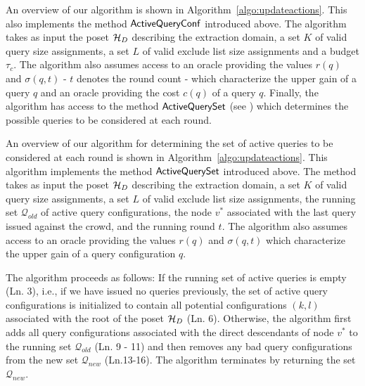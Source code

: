 An overview of our algorithm is shown in Algorithm~\ref{algo:updateactions}. This also implements the method ${\sf ActiveQueryConf}$ introduced above. The algorithm takes as input the poset $\mathcal{H}_D$ describing the extraction domain, a set $K$ of valid query size assignments, a set $L$ of valid exclude list size assignments and a budget $\tau_c$. The algorithm also assumes access to an oracle providing the values $r(q)$ and $\sigma(q,t)$ - $t$ denotes the round count -  which characterize the upper gain of a query $q$ and an oracle providing the cost $c(q)$ of a query $q$. Finally, the algorithm has access to the method ${\sf ActiveQuerySet}$ (see ) which determines the possible queries to be considered at each round.

An overview of our algorithm for determining the set of active queries to be considered at each round is shown in Algorithm~\ref{algo:updateactions}. This algorithm implements the method ${\sf ActiveQuerySet}$ introduced above. The method takes as input the poset $\mathcal{H}_D$ describing the extraction domain, a set $K$ of valid query size assignments, a set $L$ of valid exclude list size assignments, the running set $\mathcal{Q}_{old}$ of active query configurations, the node $v^*$ associated with the last query issued against the crowd, and the running round $t$. The algorithm also assumes access to an oracle providing the values $r(q)$ and $\sigma(q,t)$  which characterize the upper gain of a query configuration $q$.

The algorithm proceeds as follows: If the running set of active queries is empty (Ln. 3), i.e., if we have issued no queries previously, the set of active query configurations is initialized to contain all potential configurations $(k,l)$ associated with the root of the poset $\mathcal{H}_D$ (Ln. 6). Otherwise, the algorithm first adds all query configurations associated with the direct descendants of node $v^*$ to the running set $\mathcal{Q}_{old}$ (Ln. 9 - 11) and then removes any bad query configurations from the new set $\mathcal{Q}_{new}$ (Ln.13-16). The algorithm terminates by returning the set $\mathcal{Q}_{new}$.

